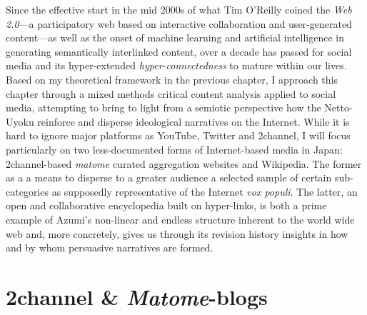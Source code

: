 \documentclass[10pt,british,A4paper,,openany]{memoir}
\begin{document}
Since the effective start in the mid 2000s of what Tim O'Reilly coined
the \emph{Web 2.0}---a participatory web based on interactive
collaboration and user-generated content---as well as the onset of
machine learning and artificial intelligence in generating semantically
interlinked content, over a decade has passed for social media and its
hyper-extended \emph{hyper-connectedness} to mature within our lives.
Based on my theoretical framework in the previous chapter, I approach
this chapter through a mixed methods critical content analysis applied
to social media, attempting to bring to light from a semiotic
perspective how the Netto-Uyoku reinforce and disperse ideological
narratives on the Internet. While it is hard to ignore major platforms
as YouTube, Twitter and 2channel, I will focus particularly on two
less-documented forms of Internet-based media in Japan: 2channel-based
\emph{matome} curated aggregation websites and Wikipedia. The former as
a a means to disperse to a greater audience a selected sample of certain
sub-categories as supposedly representative of the Internet \emph{vox
populi}. The latter, an open and collaborative encyclopedia built on
hyper-links, is both a prime example of Azumi's non-linear and endless
structure inherent to the world wide web and, more concretely, gives us
through its revision history insights in how and by whom persuasive
narratives are formed.

\section{\texorpdfstring{2channel \&
\emph{Matome}-blogs}{2channel \& Matome-blogs}}\label{channel-matome-blogs}
\end{document}
